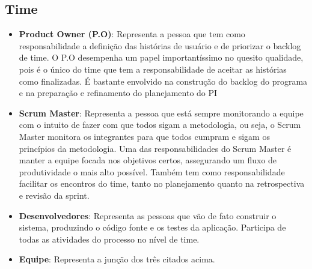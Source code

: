 \subsection{\textbf{Time}}

  \begin{itemize}
    \item \textbf{Product Owner (P.O)}: Representa a pessoa que tem como responsabilidade a definição das histórias de usuário e de
      priorizar o backlog de time. O P.O desempenha um papel importantíssimo no quesito qualidade, pois é o único do time que tem a
      responsabilidade de aceitar as histórias como finalizadas. É bastante envolvido na construção do backlog do programa e na
      preparação e refinamento do planejamento do PI
    \item \textbf{Scrum Master}: Representa a pessoa que está sempre monitorando a equipe com o intuito de fazer com que todos sigam
      a metodologia, ou seja, o Scrum Master monitora os integrantes para que todos cumpram e sigam os princípios da metodologia.
      Uma das responsabilidades do Scrum Master é manter a equipe focada nos objetivos certos, assegurando um fluxo de produtividade
      o mais alto possível. Também tem como responsabilidade facilitar os encontros do time, tanto no planejamento quanto na
      retrospectiva e revisão da sprint.
    \item \textbf{Desenvolvedores}: Representa as pessoas que vão de fato construir o sistema, produzindo o código fonte e os testes
      da aplicação. Participa de todas as atividades do processo no nível de time.
    \item \textbf{Equipe}: Representa a junção dos três citados acima.
  \end{itemize}

